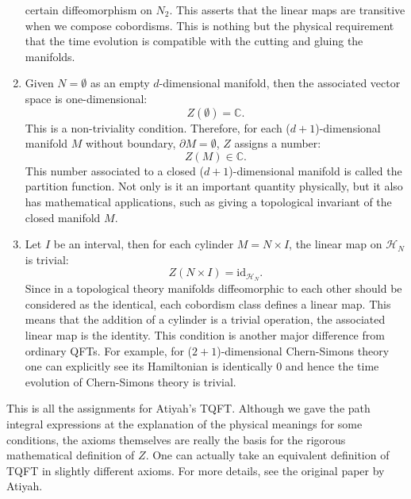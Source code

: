 \begin{enumerate}
certain diffeomorphism on $N_{2}$. This asserts that the linear maps
are transitive when we compose cobordisms. This is nothing but the
physical requirement that the time evolution is compatible with the
cutting and gluing the manifolds. 
  \item Given $N=\emptyset$ as an empty $d$-dimensional manifold, then the
associated vector space is one-dimensional:
\begin{equation}
  Z\left(\emptyset\right)  =  \mathbb{C}.
\end{equation}
This is a non-triviality condition. Therefore, for each ($d+1$)-dimensional
manifold $M$ without boundary, $\partial M=\emptyset$, $Z$ assigns
a number: 
\begin{equation}
  Z\left(M\right)  \in  \mathbb{C}.
\end{equation}
 This number associated to a closed ($d+1$)-dimensional manifold
is called the partition function. Not only is it an important quantity
physically, but it also has mathematical applications, such as giving
a topological invariant of the closed manifold $M$. 
\item Let $I$ be an interval, then for each cylinder $M=N\times I$, the
linear map on $\mathcal{H}_{N}$ is trivial: 
\begin{equation}
  Z\left(N\times I\right)  =  \mathrm{id}_{\mathcal{H}_{N}}.
\end{equation}
 Since in a topological theory manifolds diffeomorphic to each other
should be considered as the identical, each cobordism class defines
a linear map. This means that the addition of a cylinder is a trivial
operation, the associated linear map is the identity. This condition
is another major difference from ordinary QFTs. For example, for ($2+1$)-dimensional
Chern-Simons theory one can explicitly see its Hamiltonian is identically
$0$ and hence the time evolution of Chern-Simons theory is trivial. 
\end{enumerate}
%
This is all the assignments for Atiyah's TQFT. Although we gave the
path integral expressions at the explanation of the physical meanings
for some conditions, the axioms themselves are really the basis for
the rigorous mathematical definition of $Z$. One can actually take
an equivalent definition of TQFT in slightly different axioms. For
more details, see the original paper by Atiyah. 

